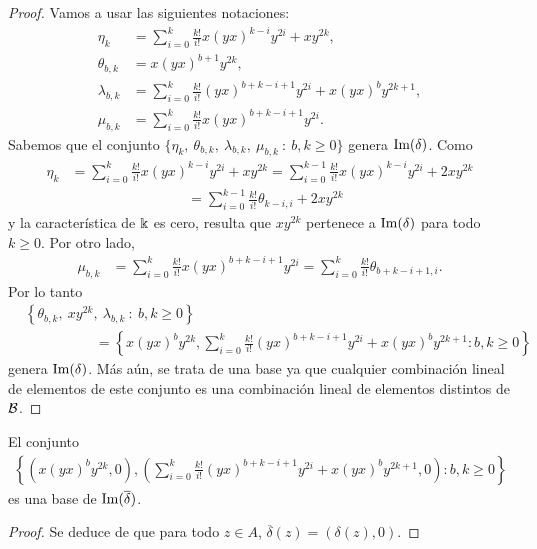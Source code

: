 \documentclass[fleqn,../tesis.tex]{subfiles}
\begin{document}
\begin{proof}
Vamos a usar las siguientes notaciones:
\begin{align*}
	\eta_k &=  \sum_{i = 0}^k\frac{k!}{i!}x(yx)^{k - i}y^{2i} + xy^{2k}, \\
	\theta_{b,k} &= x(yx)^{b + 1}y^{2k},\\
	\lambda_{b,k} &= \sum_{i = 0}^k\frac{k!}{i!}(yx)^{b + k - i + 1}y^{2i} + x(yx)^by^{2k + 1}, \\
	\mu_{b,k} &= \sum_{i = 0}^k\frac{k!}{i!}x(yx)^{b + k - i + 1}y^{2i}.
\end{align*}
Sabemos que el conjunto $\{\eta_k,\ \theta_{b,k},\ \lambda_{b,k},\ \mu_{b,k}\ :\ b,k \geq 0\}$ genera $\operatorname{Im}(\delta)$.
Como
\begin{align*}
	\eta_k &= \sum_{i = 0}^{k}\frac{k!}{i!}x(yx)^{k - i}y^{2i} + xy^{2k}
		= \sum_{i = 0}^{k-1}\frac{k!}{i!}x(yx)^{k - i}y^{2i} + 2xy^{2k} \\
	&\hspace{100pt}= \sum_{i = 0}^{k -1}\frac{k!}{i!}\theta_{k - i, i} + 2xy^{2k}
\end{align*}
y la característica de $\Bbbk$ es cero, resulta que $xy^{2k}$ pertenece a $\operatorname{Im}(\delta)$ para todo $k \geq 0$. Por otro lado,
\begin{align*}
	\mu_{b,k} &= \sum_{i = 0}^k\frac{k!}{i!}x(yx)^{b + k - i + 1}y^{2i}
		= \sum_{i = 0}^k\frac{k!}{i!}\theta_{b + k - i + 1, i}.
\end{align*}
Por lo tanto
\begin{align*}
	&\left\{\theta_{b,k},\ xy^{2k},\ \lambda_{b,k}\ :\ b,k \geq 0 \right\} \\
	&\hspace{60pt}= \left\{ x(yx)^by^{2k},
			\sum_{i = 0}^k\frac{k!}{i!}(yx)^{b + k - i + 1}y^{2i} + x(yx)^by^{2k + 1} :b, k \geq 0 \right\}
\end{align*}
genera $\operatorname{Im}(\delta)$. Más aún, se trata de una base ya que cualquier combinación lineal de elementos de este conjunto es una
combinación lineal de elementos distintos de $\mathcal{B}$.
\end{proof}
\begin{prop}
El conjunto
\begin{align*}
		\left\{ \left(x(yx)^by^{2k}, 0\right),
			\left(\sum_{i = 0}^k\frac{k!}{i!}(yx)^{b + k - i + 1}y^{2i} + x(yx)^by^{2k + 1},0\right) :b, k \geq 0 \right\}
\end{align*}
es una base de $\operatorname{Im}(\overline{\delta})$.
\end{prop}
\begin{proof}
	Se deduce de que para todo $z \in A$, $\overline{\delta}(z) = (\delta(z), 0)$.
\end{proof}
\end{document}
